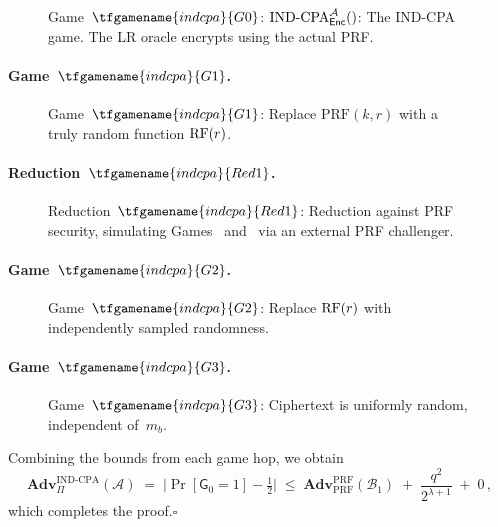 \documentclass{article}
\begin{document}
\begin{figure}[ht]
\centering
{}
\caption{Game~$\tfgamename{indcpa}{G0}$: $\mathrm{IND\text{-}CPA}_{\mathsf{Enc}}^{\mathcal{A}}()$: The IND-CPA game. The LR oracle encrypts using the actual PRF.}
\label{fig:G0}
\end{figure}

\paragraph{Game~$\tfgamename{indcpa}{G1}$.}


\begin{figure}[ht]
\centering
{}
\caption{Game~$\tfgamename{indcpa}{G1}$: Replace $\mathrm{PRF}(k, r)$ with a truly random function $\mathrm{RF}(r)$.}
\label{fig:G1}
\end{figure}

\paragraph{Reduction~$\tfgamename{indcpa}{Red1}$.}


\begin{figure}[ht]
\centering
{}
\caption{Reduction~$\tfgamename{indcpa}{Red1}$: Reduction against PRF security, simulating Games~ and~ via an external PRF challenger.}
\label{fig:Red1}
\end{figure}

\paragraph{Game~$\tfgamename{indcpa}{G2}$.}


\begin{figure}[ht]
\centering
{}
\caption{Game~$\tfgamename{indcpa}{G2}$: Replace $\mathrm{RF}(r)$ with independently sampled randomness.}
\label{fig:G2}
\end{figure}

\paragraph{Game~$\tfgamename{indcpa}{G3}$.}


\begin{figure}[ht]
\centering
{}
\caption{Game~$\tfgamename{indcpa}{G3}$: Ciphertext is uniformly random, independent of~$m_b$.}
\label{fig:G3}
\end{figure}

\noindent
Combining the bounds from each game hop, we obtain
\[
  \mathbf{Adv}^{\mathrm{IND\text{-}CPA}}_\Pi(\mathcal{A})
  \;=\;
  \bigl|\Pr[\mathsf{G}_0 = 1] - \tfrac{1}{2}\bigr|
  \;\leq\;
  \mathbf{Adv}^{\mathrm{PRF}}_{\mathrm{PRF}}(\mathcal{B}_1)
  \;+\; \frac{q^2}{2^{\lambda+1}}
  \;+\; 0 \,,
\]
which completes the proof.\hfill$\square$
\end{document}
